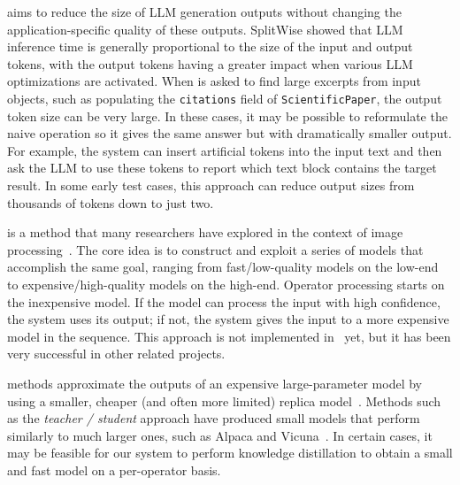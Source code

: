  aims to reduce the size of LLM generation outputs without changing the application-specific quality of these outputs. SplitWise \cite{patel2023splitwise} showed that LLM inference time is generally proportional to the size of the input and output tokens, with the output tokens having a greater impact when various LLM optimizations are activated. When \system{} is asked to find large excerpts from input objects, such as populating the {\tt citations} field of {\tt ScientificPaper}, the output token size can be very large. In these cases, it may be possible to reformulate the naive operation so it gives the same answer but with dramatically smaller output. For example, the system can insert artificial tokens into the input text and then ask the LLM to use these tokens to report which text block contains the target result.  In some early test cases, this approach can reduce output sizes from thousands of tokens down to just two.

 is a method that many researchers have explored in the context of image processing~\cite{10.14778/3137628.3137664, anderson2019physical, Cai2015LearningCC, Sun2013DeepCN, cascadeserve}. The core idea is to construct and exploit a series of models that accomplish the same goal, ranging from  fast/low-quality models on the low-end to expensive/high-quality models on the high-end. Operator processing starts on the inexpensive model. If the model can process the input with high confidence, the system uses its output; if not, the system gives the input to a more expensive model in the sequence. This approach is not implemented in \system\ yet, but it has been very successful in other related projects.

 methods approximate the outputs of an expensive large-parameter model by using a smaller, cheaper (and often more limited) replica model~\cite{gu2024minillm, hinton2015distilling, Gou_2021}. Methods such as the {\em teacher / student} approach have produced small models that perform similarly to much larger ones, such as Alpaca and Vicuna~\cite{alpaca, vicuna2023}. In certain cases, it may be feasible for our system to perform knowledge distillation to obtain a small and fast model on a per-operator basis.


